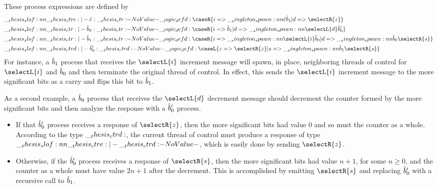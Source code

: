 These process expressions are defined by 
\begin{equation*}
  \begin{lgathered}
    \slof{ \ctre |- \defp{e} : \ctr } \defd
      \caseR{ i => \spawn{\defp{e}}{\defp{b}_1}
            | d => \selectR{z} }
    \\
    \slof{ \ctr |- \defp{b}_0 : \ctr } \defd
      \caseR{ i => \defp{b}_1
            | d => \spawn{\selectL{d}}{\defp{b}'_0} }
    \\
    \slof{ \ctr |- \defp{b}_1 : \ctr } \defd
      \caseR{ i => \spawn{\selectL{i}}{\defp{b}_0}
            | d => \spawn{\defp{b}_0}{\selectR{s}} }
    \\
    \slof{ \ctrd |- \defp{b}'_0 : \ctrd } \defd
      \caseL{ z => \selectR{z}
            | s => \spawn{\defp{b}_1}{\selectR{s}} }
  \end{lgathered}
\end{equation*}
For instance, a $\hat{b}_1$ process that receives the $\selectL{i}$ increment message will spawn, in place, neighboring threads of control for $\selectL{i}$ and $\hat{b}_0$ and then terminate the original thread of control.
In effect, this sends the $\selectL{i}$ increment message to the more significant bits as a carry and flips this bit to $\hat{b}_1$.

As a second example, a $\hat{b}_0$ process that receives the $\selectL{d}$ decrement message should decrement the counter formed by the more significant bits and then analyze the response with a $\hat{b}'_0$ process.
\begin{itemize}
\item If that $\hat{b}'_0$ process receives a response of $\selectR{z}$, then the more significant bits had value $0$ and so must the counter as a whole.
  According to the type $\__thesis_ctrd:$, the current thread of control must produce a response of type $\slof{\ctre |- \ctrd}$, which is easily done by sending $\selectR{z}$.
\item Otherwise, if the $\hat{b}'_0$ process receives a response of $\selectR{s}$, then the more significant bits had value $n+1$, for some $n \geq 0$, and the counter as a whole must have value $2n+1$ after the decrement.
  This is accomplished by emitting $\selectR{s}$ and replacing $\hat{b}'_0$ with a recursive call to $\hat{b}_1$.
\end{itemize}

